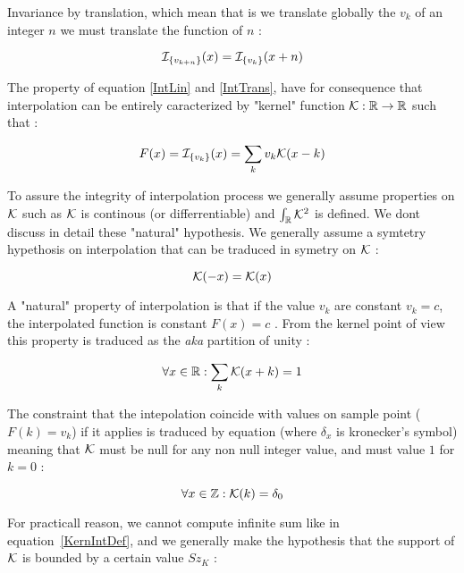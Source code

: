 Invariance by translation, which mean that is we translate globally the $v_k$ of an integer $n$
we must translate the function of $n$ :

\begin{equation}
    \mathcal I_{\{v_{k+n}\}}(x) =  \mathcal I_{\{v_{k}\}}(x+n)  \label{IntTrans}
\end{equation}

The property of equation \ref{IntLin} and \ref{IntTrans}, have for consequence that interpolation
can be entirely caracterized by "kernel" function $\mathcal K : \mathbb{R} \rightarrow \mathbb{R} $ such that :

\begin{equation}
    F(x) =  \mathcal I_{\{v_{k}\}}(x) = \sum_{k}  v_k  \mathcal K(x-k)   \label{KernIntDef}
\end{equation}

To assure the  integrity of interpolation process we generally assume properties on $\mathcal K$
such as $\mathcal K$ is continous (or differrentiable) and  $\int_{\mathbb{R}} \mathcal K ^2 $ is defined. We dont
discuss in detail these "natural" hypothesis.
We generally assume a symtetry hypethosis on interpolation that can be traduced in symetry on
$\mathcal K$ :

\begin{equation}
    \mathcal K(-x) =   \mathcal K(x)   \label{KernIntSym}
\end{equation}


A "natural" property of interpolation is that if the value $v_k$ are constant $v_k=c$, the interpolated function 
is constant $F(x)=c$ . From the kernel point of view this property is traduced as the \emph{aka} partition of unity :

\begin{equation}
    \forall x \in \mathbb{R} : \sum_k \mathcal K(x+k) =   1 \label{PartUnit}
\end{equation}


The constraint that the intepolation coincide with values on sample point ($F(k)=v_k$) if it
applies  is traduced by equation (where $\delta_x$ is kronecker's symbol) meaning that $ \mathcal K$ must
be null for any non null integer value, and must value $1$ for $k=0$ :

\begin{equation}
    \forall x \in \mathbb{Z} :  \mathcal K(k) =   \delta_0 \label{KernIntDelta0}
\end{equation}

For practicall reason, we cannot compute infinite sum like in equation~\ref{KernIntDef}, and we 
generally make the hypothesis that the support of $\mathcal K$ is bounded by a certain value $Sz_K$ :


